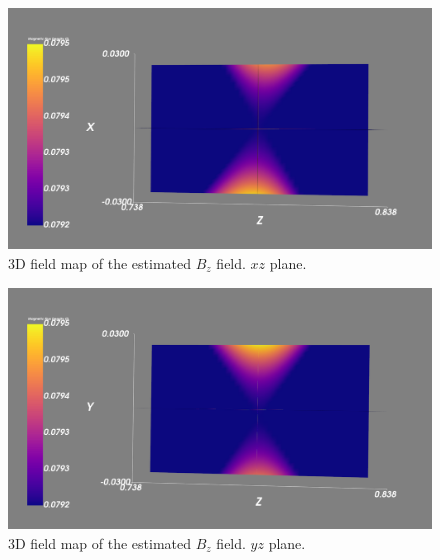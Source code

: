 \begin{figure}[!h]
    \centering
    \includegraphics[width=\linewidth]{figs/3dxview}
    \caption{3D field map of the estimated $B_z$ field.
        $xz$ plane.}
    \label{fig:3dmapxz}
\end{figure}

\begin{figure}[!h]
    \centering
    \includegraphics[width=\linewidth]{figs/3dyview.png}
    \caption{3D field map of the estimated $B_z$ field.
        $yz$ plane.}
    \label{fig:3dmapyz}
\end{figure}
